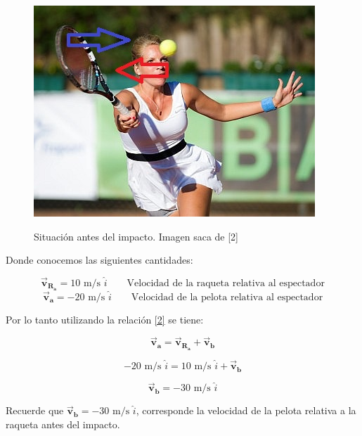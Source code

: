 \documentclass[a4paper,11pt]{article}
\theoremstyle{mytheor}
\begin{document}
\begin{figure}[h]
	\includegraphics[width=1.0\linewidth]{ten}
	\label{fcN4}
		\caption{Situación antes del impacto. Imagen saca de [2]}
\end{figure}



Donde conocemos las siguientes cantidades:




$$ \vec{\textbf{v}}_{\textbf{R}_\textbf{a}} = 10 \text{ m/s } \hat{i} \qquad \text{Velocidad de la raqueta relativa al espectador}$$
$$ \vec{\textbf{v}}_{\textbf{a}} = -20 \text{ m/s } \hat{i} \qquad \text{Velocidad de la pelota relativa al espectador}$$ 

Por lo tanto utilizando la relación \ref{2} se tiene:


\begin{equation}
\vec{\textbf{v}}_{\textbf{a}} = \vec{\textbf{v}}_{\textbf{R}_\textbf{a}} + \vec{\textbf{v}}_{\textbf{b}} 
\end{equation}


\begin{equation}
-20 \text{ m/s } \hat{i} =  10 \text{ m/s } \hat{i} + \vec{\textbf{v}}_{\textbf{b}} 
\end{equation}

\begin{equation}
 \vec{\textbf{v}}_{\textbf{b}}=  -30 \text{ m/s } \hat{i}  
\end{equation}

Recuerde que  $\vec{\textbf{v}}_{\textbf{b}} = -30  \text{ m/s } \hat{i} $, corresponde  la velocidad de la pelota relativa a la raqueta antes del impacto.
\end{document}
